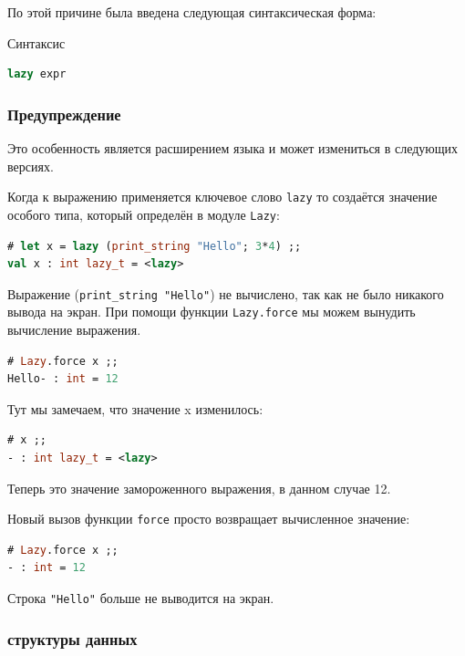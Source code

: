 По этой причине была введена следующая синтаксическая форма:

Синтаксис

\begin{lstlisting}[language=OCaml]
lazy expr
\end{lstlisting}

\subsubsection{Предупреждение}

Это особенность является расширением языка и может измениться в следующих
версиях.

Когда к выражению применяется ключевое слово \texttt{lazy} то создаётся значение
особого типа, который определён в модуле \texttt{Lazy}:

\begin{lstlisting}[language=OCaml]
# let x = lazy (print_string "Hello"; 3*4) ;;
val x : int lazy_t = <lazy>
\end{lstlisting}

Выражение (\texttt{print\_string "Hello"}) не вычислено, так как не было
никакого вывода на экран. При помощи функции \texttt{Lazy.force} мы можем
вынудить вычисление выражения.

\begin{lstlisting}[language=OCaml]
# Lazy.force x ;;
Hello- : int = 12
\end{lstlisting}

Тут мы замечаем, что значение x изменилось:

\begin{lstlisting}[language=OCaml]
# x ;;
- : int lazy_t = <lazy>
\end{lstlisting}

Теперь это значение замороженного выражения, в данном случае 12.

Новый вызов функции \texttt{force} просто возвращает вычисленное значение:

\begin{lstlisting}[language=OCaml]
# Lazy.force x ;;
- : int = 12
\end{lstlisting}

Строка \texttt{"Hello"} больше не выводится на экран.

\subsubsection{ структуры данных}

